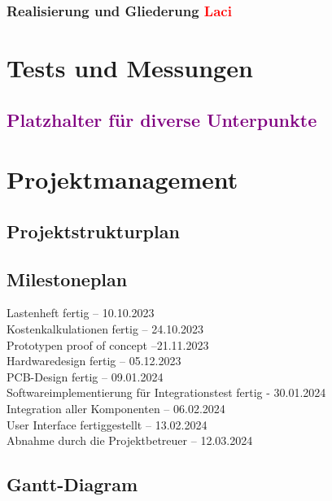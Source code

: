 \documentclass[titlepage,12pt,twoside]{article}
\begin{document}
\subsubsection{Realisierung und Gliederung \textcolor{red}{Laci}}

\section{Tests und Messungen}
\subsection{\textcolor{purple}{Platzhalter für diverse Unterpunkte}}

\section{Projektmanagement}
\subsection{Projektstrukturplan}
\subsection{Milestoneplan}
Lastenheft fertig – 10.10.2023 \\
Kostenkalkulationen fertig – 24.10.2023 \\
Prototypen proof of concept –21.11.2023 \\
Hardwaredesign fertig – 05.12.2023 \\
PCB-Design fertig – 09.01.2024 \\
Softwareimplementierung für Integrationstest fertig - 30.01.2024 \\
Integration aller Komponenten – 06.02.2024 \\
User Interface fertiggestellt – 13.02.2024 \\
Abnahme durch die Projektbetreuer – 12.03.2024

\subsection{Gantt-Diagram}
\end{document}
